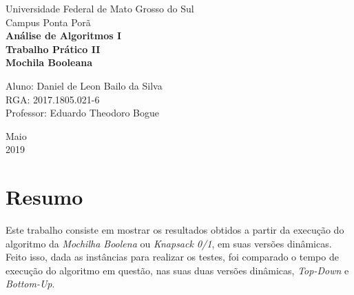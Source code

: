 \documentclass[a4paper, 12pt]{article}
\begin{document}
\begin{titlepage}
    \begin{center}
		\LARGE{Universidade Federal de Mato Grosso do Sul}\\
		\vspace{15pt}
        \large{Campus Ponta Porã}\\ 
        \large{{\textbf{Análise de Algoritmos I}}}\\ 
        \vspace{15pt}
        \vspace{95pt}
        \textbf{\large{Trabalho Prático II}}\\
        \vspace{15pt}
        \textbf{\LARGE{Mochila Booleana}}\\
        \vspace{3,5cm}
    \end{center}
    
    \begin{flushleft}
        \begin{tabbing}
            Aluno: Daniel de Leon Bailo da Silva\\            
            RGA: 2017.1805.021-6\\
            Professor: Eduardo Theodoro Bogue\\
    \end{tabbing}
 \end{flushleft}
    \vspace{1cm}
    
    \begin{center}
        \vspace{\fill}
            Maio\\
         2019
            \end{center}
\end{titlepage}

\newpage
\tableofcontents
\thispagestyle{empty}

\newpage
{}
\section{Resumo}
Este trabalho consiste em mostrar os resultados obtidos a partir da execução 
do algoritmo da {\it Mochilha Boolena} ou {\it Knapsack 0/1}, em suas versões dinâmicas.
Feito isso, dada as instâncias para realizar os testes, foi comparado o tempo de execução do algoritmo em questão, nas suas duas versões dinâmicas, {\it Top-Down} e  {\it Bottom-Up}.
\end{document}
